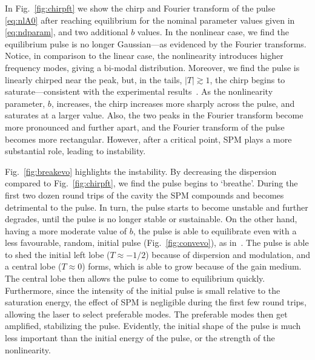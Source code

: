 \documentclass[9pt,twocolumn,twoside]{osajnl}
\begin{document}
In Fig.~\ref{fig:chirpft} we show the chirp and Fourier transform of the pulse \eqref{eq:nlA0} after reaching equilibrium for the nominal parameter values given in \eqref{eq:ndparam}, and two additional $b$ values. In the nonlinear case, we find the equilibrium pulse is no longer Gaussian---as evidenced by the Fourier transforms. Notice, in comparison to the linear case, the nonlinearity introduces higher frequency modes, giving a bi-modal distribution. Moreover, we find the pulse is linearly chirped near the peak, but, in the tails, $|T| \gtrsim 1$, the chirp begins to saturate---consistent with the experimental results~\cite{chen2008, rothenberg1989b, tomlinson1985}. As the nonlinearity parameter, $b$, increases, the chirp increases more sharply across the pulse, and saturates at a larger value. Also, the two peaks in the Fourier transform become more pronounced and further apart, and the Fourier transform of the pulse becomes more rectangular. However, after a critical point, SPM plays a more substantial role, leading to instability.

Fig.~\ref{fig:breakevo} highlights the instability. By decreasing the dispersion compared to Fig.~\ref{fig:chirpft}, we find the pulse begins to `breathe'. During the first two dozen round trips of the cavity the SPM compounds and becomes detrimental to the pulse. In turn, the pulse starts to become unstable and further degrades, until the pulse is no longer stable or sustainable. On the other hand, having a more moderate value of $b$, the pulse is able to equilibrate even with a less favourable, random, initial pulse (Fig.~\ref{fig:convevo}), as in~\cite{meng2020}. The pulse is able to shed the initial left lobe ($T \approx -1 / 2$) because of dispersion and modulation, and a central lobe ($T \approx 0$) forms, which is able to grow because of the gain medium. The central lobe then allows the pulse to come to equilibrium quickly. Furthermore, since the intensity of the initial pulse is small relative to the saturation energy, the effect of SPM is negligible during the first few round trips, allowing the laser to select preferable modes. The preferable modes then get amplified, stabilizing the pulse. Evidently, the initial shape of the pulse is much less important than the initial energy of the pulse, or the strength of the nonlinearity.
\end{document}
